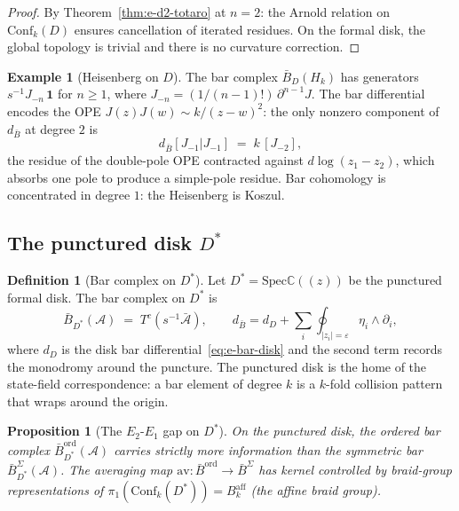 \documentclass[11pt,reqno]{amsart}
\newtheorem{proposition}[theorem]{Proposition}
\theoremstyle{definition}
\newtheorem{definition}[theorem]{Definition}
\newtheorem{example}[theorem]{Example}
\theoremstyle{remark}
\providecommand{\cA}{\mathcal{A}}
\providecommand{\Conf}{\mathrm{Conf}}
\providecommand{\Eone}{E_1}
\providecommand{\Etwo}{E_2}
\providecommand{\barB}{\bar{B}}
\providecommand{\Barord}{\bar{B}^{\mathrm{ord}}}
\providecommand{\BarSig}{\bar{B}^{\Sigma}}
\providecommand{\bC}{\mathbb{C}}
\providecommand{\Spec}{\mathrm{Spec}}
\begin{document}
\begin{proof}
By Theorem~\ref{thm:e-d2-totaro} at $n = 2$: the Arnold
relation on $\Conf_k(D)$ ensures cancellation of iterated
residues. On the formal disk, the global topology is trivial
and there is no curvature correction.
\end{proof}

\begin{example}[Heisenberg on $D$]\label{ex:e-heis-disk}
The bar complex $\barB_D(H_k)$ has generators
$s^{-1}J_{-n}\,\mathbf{1}$ for $n \ge 1$, where
$J_{-n} = (1/(n{-}1)!)\,\partial^{n-1}J$. The bar
differential encodes the OPE $J(z)J(w) \sim k/(z-w)^2$:
the only nonzero component of $d_{\barB}$ at degree $2$ is
\[
d_{\barB}[J_{-1}|J_{-1}]
\;=\; k\,[J_{-2}],
\]
the residue of the double-pole OPE contracted against
$d\log(z_1 - z_2)$, which absorbs one pole to produce a
simple-pole residue. Bar cohomology is concentrated in
degree $1$: the Heisenberg is Koszul.
\end{example}

\subsection{The punctured disk $D^*$}

\begin{definition}[Bar complex on $D^*$]
\label{def:e-bar-punc}
Let $D^* = \Spec\bC((z))$ be the punctured formal disk. The
bar complex on $D^*$ is
\begin{equation}\label{eq:e-bar-punc}
\barB_{D^*}(\cA)
\;=\;
T^c(s^{-1}\bar{\cA}),
\qquad
d_{\barB}
= d_D
+ \sum_i \oint_{|z_i| = \varepsilon} \eta_i \wedge \partial_i,
\end{equation}
where $d_D$ is the disk bar differential~\eqref{eq:e-bar-disk}
and the second term records the monodromy around the puncture.
The punctured disk is the home of the state-field
correspondence: a bar element of degree $k$ is a $k$-fold
collision pattern that wraps around the origin.
\end{definition}

\begin{proposition}[The $\Etwo$-$\Eone$ gap on $D^*$]
\label{prop:e-e2-e1-gap}
On the punctured disk, the ordered bar complex
$\Barord_{D^*}(\cA)$ carries strictly more information than the
symmetric bar $\BarSig_{D^*}(\cA)$. The averaging map
$\mathrm{av}\colon \Barord \to \BarSig$ has kernel controlled
by braid-group representations of
$\pi_1(\Conf_k(D^*)) = B_k^{\mathrm{aff}}$
\textup{(}the affine braid group\textup{)}.
\end{proposition}
\end{document}
